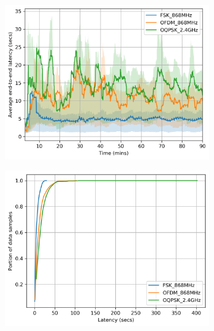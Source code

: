 \documentclass[sensors,article,submit,moreauthors,pdftex]{Definitions/mdpi}
\begin{document}
\begin{figure}
	\centering
	\begin{subfigure}{0.49\columnwidth}
    	\centering
    	\includegraphics[width=1.00\columnwidth]{latency_time}
        \label{fig:latency_time}
	\end{subfigure}
	\begin{subfigure}{0.49\columnwidth}
		\centering
    	\includegraphics[width=1.00\columnwidth]{latency_cdf}
        \label{fig:latency_cdf}
	\end{subfigure}
	\begin{subfigure}{0.49\columnwidth}

\end{subfigure}
\end{figure}
\end{document}
